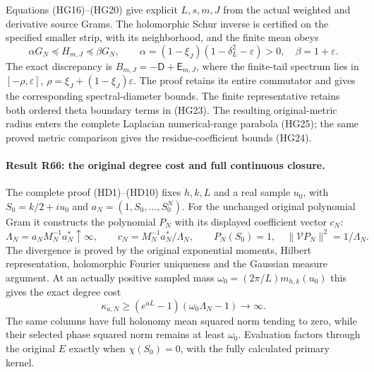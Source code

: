 Equations (HG16)--(HG20) give explicit $L,s,m,J$ from the actual
weighted and derivative source Grams. The holomorphic Schur
inverse is certified on the specified smaller strip, with its
neighborhood, and the finite mean obeys
\[
 \alpha G_N\preceq H_{m,J}\preceq\beta G_N,\qquad
 \alpha=(1-\xi_J)(1-\delta_L^2-\varepsilon)>0,
 \quad\beta=1+\varepsilon.
\]
The exact discrepancy is $B_{m,J}=-\mathsf D+\mathsf E_{m,J}$,
where the finite-tail spectrum lies in $[-\rho,\varepsilon]$,
$\rho=\xi_J+(1-\xi_J)\varepsilon$. The proof retains its entire
commutator and gives the corresponding spectral-diameter bounds.
The finite representative retains both ordered theta boundary
terms in (HG23). The resulting original-metric radius enters the
complete Laplacian numerical-range parabola (HG25); the same proved
metric comparison gives the residue-coefficient bounds (HG24).

\paragraph{Result R66: the original degree cost and full continuous closure.}
The complete proof (HD1)--(HD10) fixes $h,k,L$ and a real sample
$u_0$, with $S_0=k/2+iu_0$ and $a_N=(1,S_0,\ldots,S_0^N)$.
For the unchanged original polynomial Gram it constructs the
polynomial $P_N$ with its displayed coefficient vector $c_N$:
\[
 \Lambda_N=a_NM_N^{-1}a_N^*\uparrow\infty,\qquad
 c_N=M_N^{-1}a_N^*/\Lambda_N,
 \qquad P_N(S_0)=1,\quad\|\mathcal V P_N\|^2=1/\Lambda_N.
\]
The divergence is proved by the original exponential moments,
Hilbert representation, holomorphic Fourier uniqueness and the
Gaussian measure argument. At an actually positive sampled mass
$\omega_0=(2\pi/L)m_{h,k}(u_0)$ this gives the exact degree cost
\[
 \kappa_{a,N}\ge(e^{aL}-1)(\omega_0\Lambda_N-1)
       \longrightarrow\infty .
\]
The same columns have full holonomy mean squared norm tending to zero,
while their selected phase squared norm remains at least $\omega_0$.
Evaluation factors through the original $E$ exactly when
$\chi(S_0)=0$, with the fully calculated primary kernel.

